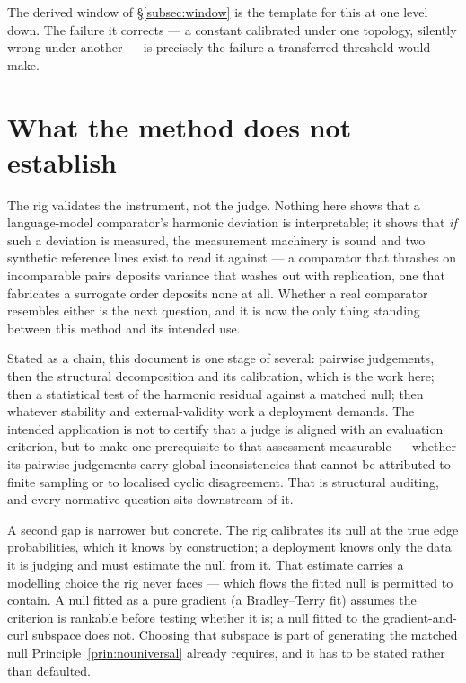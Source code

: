 \documentclass[11pt,a4paper]{article}
\begin{document}
The derived window of \S\ref{subsec:window} is the template for this at one level down. The
failure it corrects --- a constant calibrated under one topology, silently wrong
under another --- is precisely the failure a transferred threshold would make.

\section{What the method does not establish}

The rig validates the instrument, not the judge. Nothing here shows that a
language-model comparator's harmonic deviation is interpretable; it shows that
\emph{if} such a deviation is measured, the measurement machinery is sound and
two synthetic reference lines exist to read it against --- a comparator that
thrashes on incomparable pairs deposits variance that washes out with
replication, one that fabricates a surrogate order deposits none at all. Whether
a real comparator resembles either is the next question, and it is now the only
thing standing between this method and its intended use.

Stated as a chain, this document is one stage of several: pairwise judgements,
then the structural decomposition and its calibration, which is the work here;
then a statistical test of the harmonic residual against a matched null; then
whatever stability and external-validity work a deployment demands. The intended
application is not to certify that a judge is aligned with an evaluation
criterion, but to make one prerequisite to that assessment measurable --- whether
its pairwise judgements carry global inconsistencies that cannot be attributed to
finite sampling or to localised cyclic disagreement. That is structural auditing,
and every normative question sits downstream of it.

A second gap is narrower but concrete. The rig calibrates its null at the true
edge probabilities, which it knows by construction; a deployment knows only the
data it is judging and must estimate the null from it. That estimate carries a
modelling choice the rig never faces --- which flows the fitted null is permitted
to contain. A null fitted as a pure gradient (a Bradley--Terry fit) assumes the
criterion is rankable before testing whether it is; a null fitted to the
gradient-and-curl subspace does not. Choosing that subspace is part of generating
the matched null Principle~\ref{prin:nouniversal} already requires, and it has to
be stated rather than defaulted.
\end{document}
